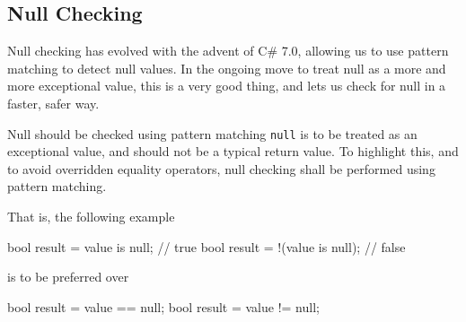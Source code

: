\documentclass[11pt,a4paper]{article}
\begin{document}
\subsection{Null Checking}
Null checking has evolved with the advent of C\# 7.0, allowing us to use pattern matching to detect null values. In the ongoing move to treat null as a more and more exceptional value, this is a very good thing, and lets us check for null in a faster, safer way.

\begin{should}{Null should be checked using pattern matching}
\texttt{null} is to be treated as an exceptional value, and should not be a typical return value. To highlight this, and to avoid overridden equality operators, null checking shall be performed using pattern matching.
\end{should}

That is, the following example
\begin{code}
bool result = value is null; // true
bool result = !(value is null); // false
\end{code}

is to be preferred over

\begin{code}
bool result = value == null;
bool result = value != null;
\end{code}

\printbibliography
\end{document}
